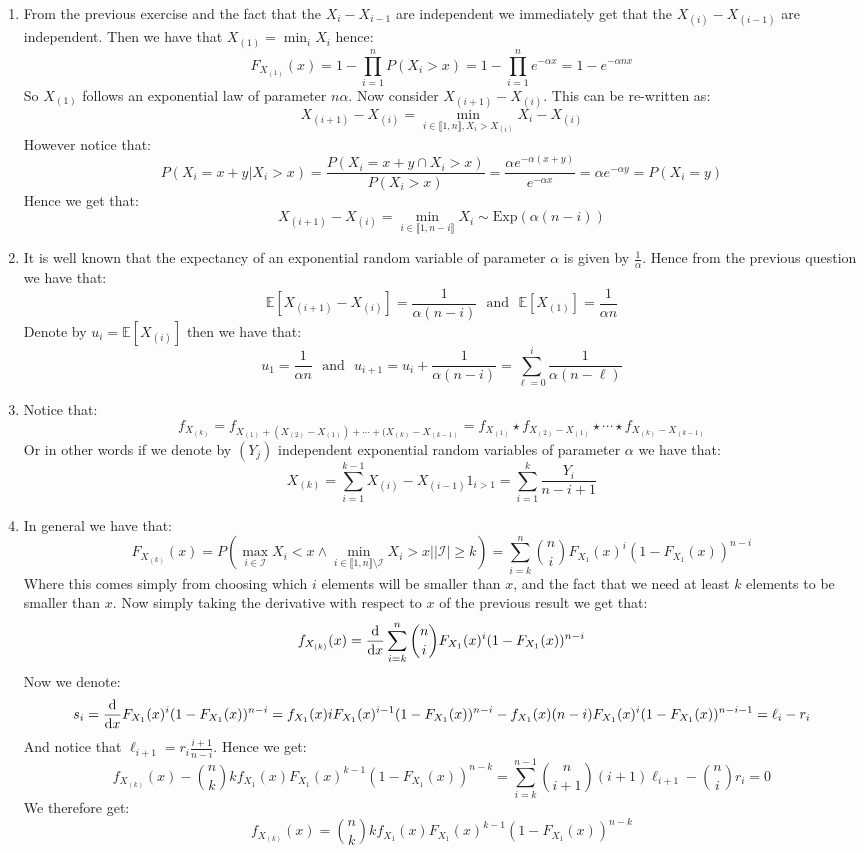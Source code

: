 \documentclass[10pt,a4paper]{article}
\begin{document}
\begin{enumerate}
\item From the previous exercise and the fact that the $X_{i} - X_{i-1}$ are independent we immediately get that the $X_{(i)} - X_{(i-1)}$ are independent. Then we have that $X_{(1)} = \min_i X_i$ hence:
\[
F_{X_{(1)}}(x) = 1 - \prod_{i = 1}^n P(X_i > x) = 1 - \prod_{i = 1}^n e^{- \alpha x} = 1 - e^{- \alpha n x}
\]
So $X_{(1)}$ follows an exponential law of parameter $n \alpha$. Now consider $X_{(i+1)} - X_{(i)}$. This can be re-written as:
\[
X_{(i+1)} - X_{(i)} = \min_{i \in \llbracket 1, n \rrbracket, X_i > X_{(i)}} X_i - X_{(i)}
\]
However notice that:
\[
P(X_i = x + y | X_i > x) = \frac{P(X_i = x+ y \cap X_i > x)}{P(X_i > x)} = \frac{\alpha e^{-\alpha(x+y)}}{e^{-\alpha x}} = \alpha e^{-\alpha y} = P(X_i = y)
\]
Hence we get that:
\[
X_{(i+1)} - X_{(i)} = \min_{i \in \llbracket 1, n - i\rrbracket} X_i \sim \mbox{Exp}(\alpha(n - i))
\]


\item It is well known that the expectancy of an exponential random variable of parameter $\alpha$ is given by $\frac{1}{\alpha}$. Hence from the previous question we have that:
\[
\mathbb{E}[X_{(i+1)} - X_{(i)}] = \frac{1}{\alpha(n - i)} \mbox{~~and~~} \mathbb{E}[X_{(1)}] = \frac{1}{\alpha n }
\]
Denote by $u_i = \mathbb{E}[X_{(i)}]$ then we have that:
\[
u_1 = \frac{1}{\alpha n} \mbox{~~and~~} u_{i+1} = u_i + \frac{1}{\alpha(n - i)} = \sum_{\ell = 0}^{i} \frac{1}{\alpha(n - \ell)}
\]

\item Notice that:
\[
f_{X_{(k)}} = f_{X_{(1)} + (X_{(2)} - X_{(1)}) + \cdots + (X_{(k)} - X_{(k-1)}} = f_{X_{(1)}} \star f_{X_{(2)} - X_{(1)}} \star \cdots \star f_{X_{(k)} - X_{(k-1)}}
\]
Or in other words if we denote by $(Y_j)$ independent exponential random variables of parameter $\alpha$ we have that:
\[
X_{(k)} = \sum_{i = 1}^{k-1} X_{(i)} - X_{(i-1)} 1_{i > 1} = \sum_{i = 1}^k \frac{Y_i}{n - i + 1}
\]

\item In general we have that:
\[
F_{X_{(k)}}(x) = P\left(\max_{i \in \mathcal{I}} X_i < x \land \min_{i \in \llbracket 1, n \rrbracket \setminus \mathcal{I}} X_i > x \big| |\mathcal{I}| \geq k\right) = \sum_{i = k}^n \binom{n}{i} F_{X_1}(x)^i (1 - F_{X_1}(x))^{n - i}
\]
Where this comes simply from choosing which $i$ elements will be smaller than $x$, and the fact that we need at least $k$ elements to be smaller than $x$. Now simply taking the derivative with respect to $x$ of the previous result we get that:
\[
f_{X_{(k)}}(x) = \dv{}{x} \sum_{i = k}^n \binom{n}{i} F_{X_1}(x)^i (1 - F_{X_1}(x))^{n - i}
\]
Now we denote:
\[
s_i = \dv{}{x} F_{X_1}(x)^i (1 - F_{X_1}(x))^{n - i} = f_{X_1}(x) i F_{X_1}(x)^{i - 1}(1 - F_{X_1}(x))^{n - i} - f_{X_1}(x) (n - i) F_{X_1}(x)^i (1 - F_{X_1}(x))^{n - i - 1} = \ell_i - r_i
\]
And notice that $\ell_{i+1} = r_i \frac{i + 1}{n - i}$. Hence we get:
\[
f_{X_{(k)}}(x) - \binom{n}{k} k f_{X_1}(x) F_{X_1}(x)^{k-1} (1 - F_{X_1}(x))^{n - k} = \sum_{i = k}^{n-1} \binom{n}{i + 1} (i + 1) \ell_{i + 1} - \binom{n}{i} r_i = 0
\]
We therefore get:
\[
f_{X_{(k)}}(x) = \binom{n}{k} k f_{X_1}(x) F_{X_1}(x)^{k-1} (1 - F_{X_1}(x))^{n - k}
\]

\end{enumerate}
\end{document}

